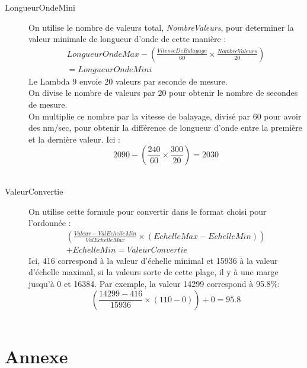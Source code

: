 \documentclass[a4paper, 12pt]{article}
\begin{document}
\begin{description}
	\item[LongueurOndeMini] On utilise le nombre de valeurs total, \emph{NombreValeurs}, pour determiner la valeur minimale de longueur d'onde de cette manière :
		\begin{multline*}
			 LongueurOndeMax - \left ( \frac{VitesseDeBalayage}{60} \times \frac{NombreValeurs}{20} \right ) 
			\\ = LongueurOndeMini 
\end{multline*}
		Le Lambda 9 envoie 20 valeurs par seconde de mesure.\\
		On divise le nombre de valeurs par 20 pour obtenir le nombre de secondes de mesure.\\
		On multiplie ce nombre par la vitesse de balayage, divisé par 60 pour avoir des nm/sec, pour obtenir la différence de longueur d'onde entre la première et la dernière valeur.
		Ici :
		$$ 2090 - \left ( \frac{240}{60} \times \frac{300}{20} \right ) = 2030 $$ \\


	\item[ValeurConvertie] On utilise cette formule pour convertir dans le format choisi pour l'ordonnée :
		\begin{multline*}
		 \left ( \frac{Valeur - ValEchelleMin}{ValEchelleMax} \times (EchelleMax - EchelleMin) \right ) 
			\\ + EchelleMin = ValeurConvertie 
			\end{multline*}
		Ici, 416 correspond à la valeur d'échelle minimal et 15936 à la valeur d'échelle maximal, si la valeurs sorte de cette plage, il y à une marge jusqu'à 0 et 16384.
		Par exemple, la valeur 14299 correspond à 95.8\%: 
		$$ \left (\frac{14299-416}{15936} \times ( 110 - 0 ) \right ) + 0 = 95.8$$\\

\end{description}

\newpage
\section{Annexe}\label{annexe}
\end{document}
